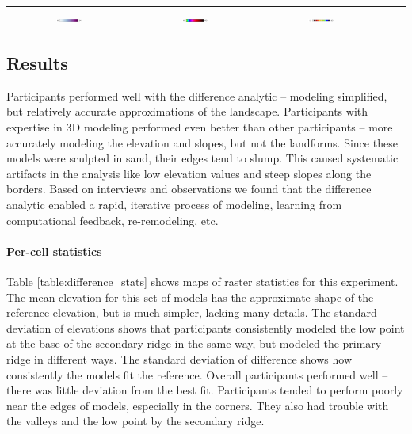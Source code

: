\documentclass[prodmode,acmtochi]{acmsmall} %
\begin{document}
\begin{table}
{\begin{tabular}{m{} m{} m{} m{} m{}}
\multicolumn{1}{c}{\includegraphics[width=0.22\textwidth]{images/legends/stdev_diff_legend.pdf}} &
\multicolumn{1}{c}{\includegraphics[width=0.22\textwidth]{images/legends/slope_legend.pdf}} &
\multicolumn{1}{c}{\includegraphics[width=0.22\textwidth]{images/legends/forms_legend.pdf}}\\
%
\bottomrule
\end{tabular}}
\label{table:difference_comparison} 
\end{table}

\subsection{Results}
Participants performed well with the difference analytic 
-- modeling simplified, but relatively accurate approximations of the landscape.
Participants with expertise in 3D modeling 
performed even better than other participants 
-- more accurately modeling the elevation and slopes, 
but not the landforms. 
Since these models were sculpted in sand,
their edges tend to slump.
This caused systematic artifacts in the analysis like
low elevation values and steep slopes
along the borders. 
Based on interviews and observations
we found that the difference analytic enabled
a rapid, iterative process 
of modeling, learning from computational feedback, 
re-remodeling, etc.

\paragraph{Per-cell statistics}
Table \ref{table:difference_stats} shows maps of raster statistics for this experiment.
The mean elevation for this set of models
has the approximate shape of the reference elevation, 
but is much simpler, lacking many details. 
The standard deviation of elevations shows that participants 
consistently modeled the low point at the base of the secondary ridge
in the same way, 
but modeled the primary ridge in different ways. 
The standard deviation of difference shows 
how consistently the models fit the reference. 
Overall participants performed well -- 
there was little deviation from the best fit. 
Participants tended to perform poorly 
near the edges of models, especially in the corners.
They also had trouble with the valleys 
and the low point by the secondary ridge.
\end{document}
